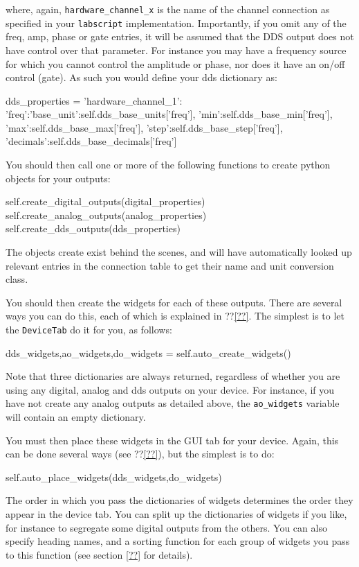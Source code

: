\documentclass[12pt]{article}
\begin{document}
where, again, \texttt{hardware\_channel\_x} is the name of the channel connection as specified in your \texttt{labscript} implementation.
Importantly, if you omit any of the freq, amp, phase or gate entries, it will be assumed that the DDS output does not have control over that parameter. 
For instance you may have a frequency source for which you cannot control the amplitude or phase, nor does it have an on/off control (gate). 
As such you would define your dds dictionary as:
\begin{python}
    dds_properties = {'hardware_channel_1':
                           {'freq':{'base_unit':self.dds_base_units['freq'],
                                    'min':self.dds_base_min['freq'],
                                    'max':self.dds_base_max['freq'],
                                    'step':self.dds_base_step['freq'],
                                    'decimals':self.dds_base_decimals['freq']
                                   }
                            }
                      }
\end{python}

You should then call one or more of the following functions to create python objects for your outputs:
\begin{python}   
    self.create_digital_outputs(digital_properties)
    self.create_analog_outputs(analog_properties)
    self.create_dds_outputs(dds_properties)
\end{python}
The objects create exist behind the scenes, and will have automatically looked up relevant entries in the connection table to get their name and unit conversion class.

You should then create the widgets for each of these outputs. 
There are several ways you can do this, each of which is explained in ??\ref{??}.
The simplest is to let the \texttt{DeviceTab} do it for you, as follows:
\begin{python}
    dds_widgets,ao_widgets,do_widgets = self.auto_create_widgets()
\end{python}
Note that three dictionaries are always returned, regardless of whether you are using any digital, analog and dds outputs on your device.
For instance, if you have not create any analog outputs as detailed above, the \texttt{ao\_widgets} variable will contain an empty dictionary.

You must then place these widgets in the GUI tab for your device.
Again, this can be done several ways (see ??\ref{??}), but the simplest is to do:
\begin{python}
    self.auto_place_widgets(dds_widgets,do_widgets)
\end{python}
The order in which you pass the dictionaries of widgets determines the order they appear in the device tab.
You can split up the dictionaries of widgets if you like, for instance to segregate some digital outputs from the others.
You can also specify heading names, and a sorting function for each group of widgets you pass to this function (see section \ref{??} for details).
\end{document}

